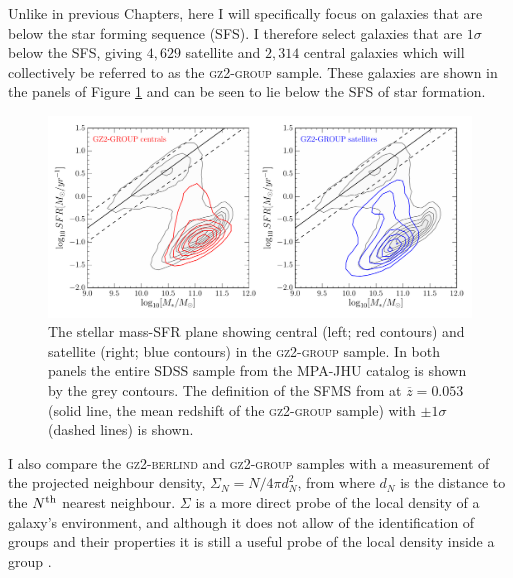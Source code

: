Unlike in previous Chapters, here I will specifically focus on galaxies that are below the star forming sequence (SFS). I therefore select galaxies that are $1\sigma$ below the SFS, giving $4,629$ satellite and $2,314$ central galaxies which will collectively be referred to as the \textsc{gz2-group} sample. These galaxies are shown in the panels of Figure \ref{fig:sfrmass} and can be seen to lie below the SFS of star formation. 

\begin{figure}
\centering
\includegraphics[width=\textwidth]{environment/sfr_mass_quenched_centrals_satellites_gz2_group.pdf}
\caption[Stellar mass-SFR plane for the centrals and satellites of the \textsc{gz2-group} sample]{The stellar mass-SFR plane showing central (left; red contours) and satellite (right; blue contours) in the \textsc{gz2-group} sample. In both panels the entire SDSS sample from the MPA-JHU catalog is shown by the grey contours. The definition of the SFMS from \cite{peng10} at $\overline{z} = 0.053$ (solid line, the mean redshift of the \textsc{gz2-group} sample) with $\pm1\sigma$ (dashed lines) is shown.}
\label{fig:sfrmass}
\end{figure}


I also compare the \textsc{gz2-berlind} and \textsc{gz2-group} samples with a measurement of the projected neighbour density, $\Sigma_N = N/4\pi d_N^2$, from \cite{Baldry06} where $d_N$ is the distance to the $N^{\rm{th}}$ nearest neighbour. $\Sigma$ is a more direct probe of the local density of a galaxy's environment, and although it does not allow of the identification of groups and their properties it is still a useful probe of the local density inside a group  \cite[see][for a comparison of various environment parameterisations]{muldrew12}.

